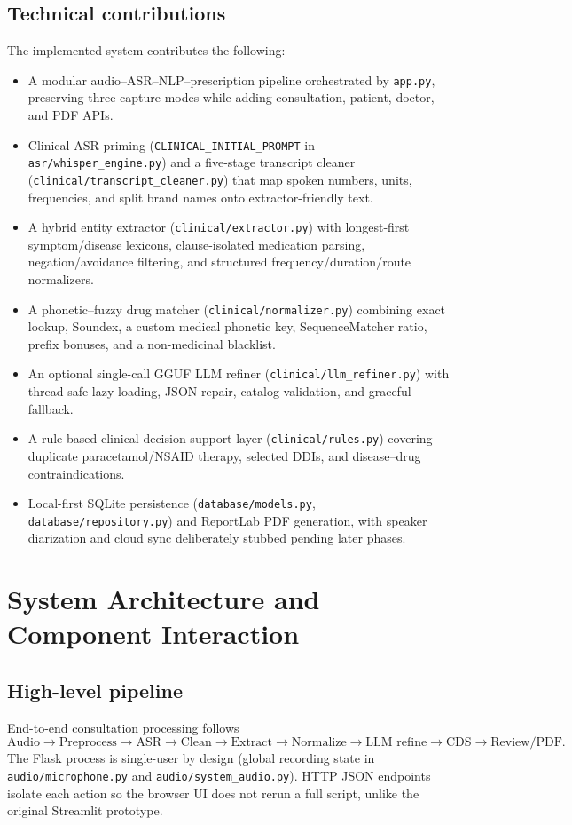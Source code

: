 \documentclass[11pt,a4paper]{article}
\begin{document}
\subsection{Technical contributions}
The implemented system contributes the following:
\begin{itemize}[leftmargin=1.4em]
  \item A modular audio--ASR--NLP--prescription pipeline orchestrated by \texttt{app.py}, preserving three capture modes while adding consultation, patient, doctor, and PDF APIs.
  \item Clinical ASR priming (\texttt{CLINICAL\_INITIAL\_PROMPT} in \texttt{asr/whisper\_engine.py}) and a five-stage transcript cleaner (\texttt{clinical/transcript\_cleaner.py}) that map spoken numbers, units, frequencies, and split brand names onto extractor-friendly text.
  \item A hybrid entity extractor (\texttt{clinical/extractor.py}) with longest-first symptom/disease lexicons, clause-isolated medication parsing, negation/avoidance filtering, and structured frequency/duration/route normalizers.
  \item A phonetic--fuzzy drug matcher (\texttt{clinical/normalizer.py}) combining exact lookup, Soundex, a custom medical phonetic key, SequenceMatcher ratio, prefix bonuses, and a non-medicinal blacklist.
  \item An optional single-call GGUF LLM refiner (\texttt{clinical/llm\_refiner.py}) with thread-safe lazy loading, JSON repair, catalog validation, and graceful fallback.
  \item A rule-based clinical decision-support layer (\texttt{clinical/rules.py}) covering duplicate paracetamol/NSAID therapy, selected DDIs, and disease--drug contraindications.
  \item Local-first SQLite persistence (\texttt{database/models.py}, \texttt{database/repository.py}) and ReportLab PDF generation, with speaker diarization and cloud sync deliberately stubbed pending later phases.
\end{itemize}

\section{System Architecture and Component Interaction}

\subsection{High-level pipeline}
End-to-end consultation processing follows
\begin{equation}
  \text{Audio}
  \rightarrow \text{Preprocess}
  \rightarrow \text{ASR}
  \rightarrow \text{Clean}
  \rightarrow \text{Extract}
  \rightarrow \text{Normalize}
  \rightarrow \text{LLM refine}
  \rightarrow \text{CDS}
  \rightarrow \text{Review/PDF}.
\end{equation}
The Flask process is single-user by design (global recording state in \texttt{audio/microphone.py} and \texttt{audio/system\_audio.py}). HTTP JSON endpoints isolate each action so the browser UI does not rerun a full script, unlike the original Streamlit prototype.
\end{document}
